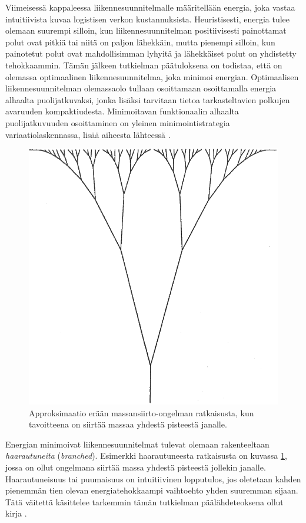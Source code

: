 \documentclass[12pt,oneside,a4paper]{amsbook} %
\begin{document}
Viimeisessä kappaleessa liikennesuunnitelmalle määritellään energia, joka vastaa intuitiivista kuvaa logistisen verkon kustannuksista. Heuristisesti, energia tulee olemaan suurempi silloin, kun liikennesuunnitelman positiivisesti painottamat polut ovat pitkiä tai niitä on paljon lähekkäin, mutta pienempi silloin, kun painotetut polut ovat mahdollisimman lyhyitä ja lähekkäiset polut on yhdistetty tehokkaammin. Tämän jälkeen tutkielman päätuloksena on todistaa, että on olemassa optimaalinen liikennesuunnitelma, joka minimoi energian. Optimaalisen liikennesuunnitelman olemassaolo tullaan osoittamaan osoittamalla energia alhaalta puolijatkuvaksi, jonka lisäksi tarvitaan tietoa tarkasteltavien polkujen avaruuden kompaktiudesta. Minimoitavan funktionaalin alhaalta puolijatkuvuuden osoittaminen on yleinen minimointistrategia variaatiolaskennassa, lisää aiheesta lähteessä \cite{benesova}.

\begin{figure}
    \centering
    \includegraphics[scale=0.7]{graphics/johdanto_branched.png}
    \caption{Approksimaatio erään massansiirto-ongelman ratkaisusta, kun tavoitteena on siirtää massaa yhdestä pisteestä janalle. \cite[s. 166]{optimal}}
    \label{fig:branched}
\end{figure}

Energian minimoivat liikennesuunnitelmat tulevat olemaan rakenteeltaan \textit{haarautuneita} (\textit{branched}). Esimerkki haarautuneesta ratkaisusta on kuvassa \ref{fig:branched}, jossa on ollut ongelmana siirtää massa yhdestä pisteestä jollekin janalle. Haarautuneisuus tai puumaisuus on intuitiivinen lopputulos, jos oletetaan kahden pienemmän tien olevan energiatehokkaampi vaihtoehto yhden suuremman sijaan. Tätä väitettä käsittelee tarkemmin tämän tutkielman päälähdeteoksena ollut kirja \cite{optimal}.
\end{document}
